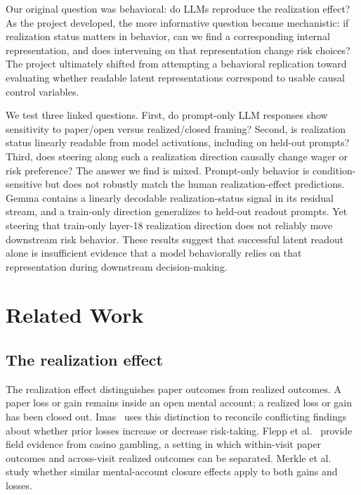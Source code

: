 \documentclass[final]{sparreport}
\begin{document}
Our original question was behavioral: do LLMs reproduce the realization effect? As the project developed, the more informative question became mechanistic: if realization status matters in behavior, can we find a corresponding internal representation, and does intervening on that representation change risk choices? The project ultimately shifted from attempting a behavioral replication toward evaluating whether readable latent representations correspond to usable causal control variables.

We test three linked questions. First, do prompt-only LLM responses show sensitivity to paper/open versus realized/closed framing? Second, is realization status linearly readable from model activations, including on held-out prompts? Third, does steering along such a realization direction causally change wager or risk preference? The answer we find is mixed. Prompt-only behavior is condition-sensitive but does not robustly match the human realization-effect predictions. Gemma contains a linearly decodable realization-status signal in its residual stream, and a train-only direction generalizes to held-out readout prompts. Yet steering that train-only layer-18 realization direction does not reliably move downstream risk behavior. These results suggest that successful latent readout alone is insufficient evidence that a model behaviorally relies on that representation during downstream decision-making.

\section{Related Work}

\subsection{The realization effect}

The realization effect distinguishes paper outcomes from realized outcomes. A paper loss or gain remains inside an open mental account; a realized loss or gain has been closed out. Imas~\cite{imas2016realization} uses this distinction to reconcile conflicting findings about whether prior losses increase or decrease risk-taking. Flepp et al.~\cite{flepp2021paper} provide field evidence from casino gambling, a setting in which within-visit paper outcomes and across-visit realized outcomes can be separated. Merkle et al.~\cite{merkle2021closing} study whether similar mental-account closure effects apply to both gains and losses.
\end{document}
